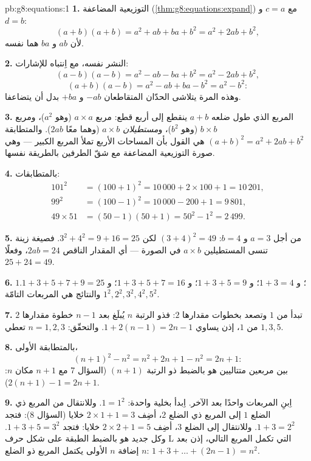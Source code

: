 \begin{solution}{pb:g8:equations:1}
\textbf{1.} التوزيعية المضاعفة
(\cref{thm:g8:equations:expand}) مع $c = a$ و $d = b$:
\[
(a + b)(a + b) = a^2 + ab + ba + b^2 = a^2 + 2ab + b^2 ,
\]
لأن $ab$ و $ba$ هما  نفسه.

\textbf{2.} النشر نفسه، مع اِنتباه للإشارات:
\[
(a - b)(a - b) = a^2 - ab - ba + b^2 = a^2 - 2ab + b^2 ,
\]
\[
(a + b)(a - b) = a^2 - ab + ba - b^2 = a^2 - b^2 :
\]
وهذه المرة يتلاشى الحدّان المتقاطعان $-ab$ و $+ba$ بدل أن
يتضاعفا.

\textbf{3.} المربع الذي طول ضلعه $a + b$ ينقطع إلى أربع قطع:
مربع $a \times a$ (وهو $a^2$)، ومربع $b \times b$ (وهو
$b^2$)، و\emph{مستطيلان} $a \times b$ (وهما معًا
$2ab$). والمتطابقة $(a+b)^2 = a^2 + 2ab + b^2$ هي القول
بأن المساحات الأربع تملأ المربع الكبير --- وهي صورة
التوزيعية المضاعفة مع شقّ الطرفين بالطريقة نفسها.

\textbf{4.} بالمتطابقات:
\begin{align*}
101^2 &= (100 + 1)^2 = 10\,000 + 2 \times 100 + 1 = 10\,201, \\
99^2 &= (100 - 1)^2 = 10\,000 - 200 + 1 = 9\,801, \\
49 \times 51 &= (50 - 1)(50 + 1) = 50^2 - 1^2 = 2\,499 .
\end{align*}

\textbf{5.} من أجل $a = 3$ و $b = 4$: $(3 + 4)^2 = 49$ لكن
$3^2 + 4^2 = 9 + 16 = 25$. فصيغة زينة تنسى المستطيلين
$a \times b$ في الصورة --- أي المقدار الناقص
$2ab = 24$، وفعلًا $25 + 24 = 49$.

\textbf{6.} $1$؛ و $1 + 3 = 4$؛ و $1 + 3 + 5 = 9$؛
و $1 + 3 + 5 + 7 = 16$؛ و $1 + 3 + 5 + 7 + 9 = 25$. والنتائج هي
المربعات التامّة $1^2, 2^2, 3^2, 4^2, 5^2$.

\textbf{7.} تبدأ  من $1$ وتصعد بخطوات مقدارها
$2$: فذو الرتبة $n$ يُبلَغ بعد $n - 1$ خطوة مقدارها $2$ من
$1$، إذن يساوي $1 + 2(n - 1) = 2n - 1$. والتحقّق: $n = 1, 2, 3$
تعطي $1, 3, 5$.

\textbf{8.} بالمتطابقة الأولى،
\[
(n + 1)^2 - n^2 = n^2 + 2n + 1 - n^2 = 2n + 1 :
\]
 بين مربعين متتاليين هو بالضبط
 ذو الرتبة $(n+1)$ (السؤال 7 مع $n + 1$ مكان $n$:
$2(n+1) - 1 = 2n + 1$).

\textbf{9.} اِبنِ المربعات واحدًا بعد الآخر. اِبدأ بخلية
واحدة: $1 = 1^2$. وللانتقال من المربع ذي الضلع $1$ إلى
المربع ذي الضلع $2$، أضِف $2 \times 1 + 1 = 3$ خلايا (السؤال
8): فتجد $1 + 3 = 2^2$. وللانتقال إلى الضلع $3$، أضِف $2 \times 2 + 1 = 5$
خلايا: فتجد $1 + 3 + 5 = 3^2$. وكل  جديد هو بالضبط
الطبقة على شكل حرف L التي تكمل المربع التالي، إذن بعد إضافة
 $n$ الأولى يكتمل المربع ذو الضلع $n$:
$1 + 3 + \dots + (2n - 1) = n^2$.


\end{solution}
